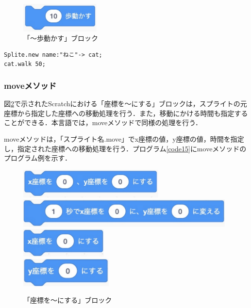 \documentclass[10pt,a4j]{ltjsarticle}
\begin{document}
\begin{figure}[H]
  \centering
  \includegraphics[height=15mm]{images/walk.pdf}
  \caption{「〜歩動かす」ブロック}
  \label{fig:walk}
\end{figure}

\begin{lstlisting}[caption=walkメソッドのプログラム例, label=code14]
Splite.new name:"ねこ"-> cat;
cat.walk 50; 
\end{lstlisting}

\subsubsection{moveメソッド}

図\ref{fig:move}で示されたScratchにおける「座標を〜にする」ブロックは，スプライトの元座標から指定した座標への移動処理を行う．また，移動にかける時間も指定することができる．本言語では，moveメソッドで同様の処理を行う．

moveメソッドは，「スプライト名.move」でx座標の値，y座標の値，時間を指定し，指定された座標への移動処理を行う．プログラム\ref{code15}にmoveメソッドのプログラム例を示す．

\begin{figure}[H]
  \centering
  \includegraphics[height=15mm]{images/move_x_y.pdf} \\
  \includegraphics[height=15mm]{images/move_x_y_time.pdf} \\
  \includegraphics[height=15mm]{images/move_x.pdf} \\
  \includegraphics[height=15mm]{images/move_y.pdf} 
  \caption{「座標を〜にする」ブロック}
  \label{fig:move}
\end{figure}
\end{document}
